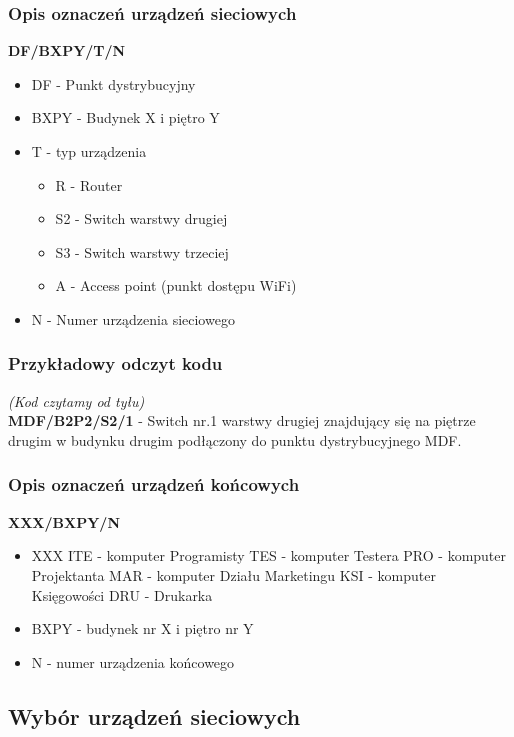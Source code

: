\documentclass[a4paper,12pt]{extarticle}  %
\begin{document}
\subsubsection{Opis oznaczeń urządzeń sieciowych}
\textbf{DF/BXPY/T/N}
\begin{itemize}
	\item DF - Punkt dystrybucyjny
	\item BXPY - Budynek X i piętro Y
	\item T - typ urządzenia
	\begin{itemize}
		\item R - Router
		\item S2 - Switch warstwy drugiej
		\item S3 - Switch warstwy trzeciej
		\item A - Access point (punkt dostępu WiFi)
	\end{itemize}
	\item N - Numer urządzenia sieciowego
\end{itemize}
\subsubsection{Przykładowy odczyt kodu}
\emph{(Kod czytamy od tyłu)}\\
\textbf{MDF/B2P2/S2/1} - Switch nr.1 warstwy drugiej znajdujący się na piętrze drugim w budynku drugim podłączony do punktu dystrybucyjnego MDF.
\subsubsection{Opis oznaczeń urządzeń końcowych}
\textbf{XXX/BXPY/N}
\begin{itemize}
    \item XXX
        \subitem ITE - komputer Programisty
        \subitem TES - komputer Testera
        \subitem PRO - komputer Projektanta
        \subitem MAR - komputer Działu Marketingu
        \subitem KSI - komputer Księgowości
        \subitem DRU - Drukarka
    \item BXPY - budynek nr X i piętro nr Y
    \item N - numer urządzenia końcowego
\end{itemize}

\subsection{Wybór urządzeń sieciowych}
\end{document}
